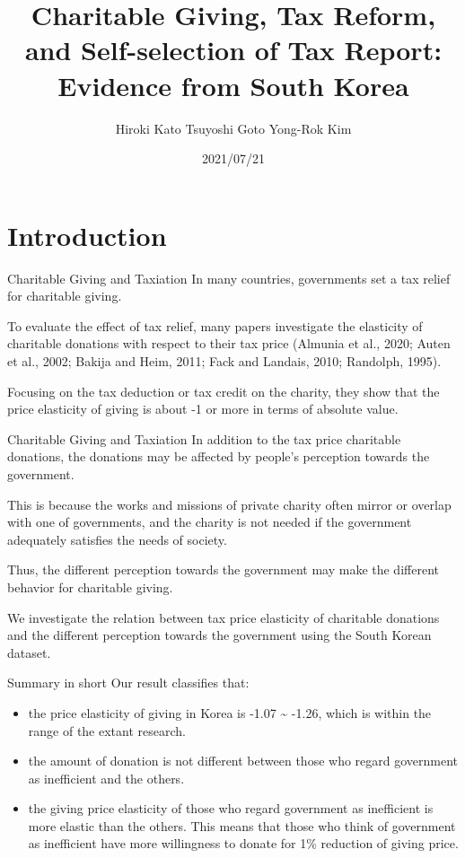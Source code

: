 \documentclass[
  ignorenonframetext,
  aspectratio=169]{beamer}
\title{Charitable Giving, Tax Reform, and Self-selection of Tax Report: Evidence from South Korea}
\author[shortname]{ Hiroki Kato  Tsuyoshi Goto  Yong-Rok Kim }
\date{2021/07/21}
\providecommand{\tightlist}{%
  \setlength{\itemsep}{0pt}\setlength{\parskip}{0pt}}
\begin{document}
\frame{\titlepage}

\hypertarget{introduction}{%
\section{Introduction}\label{introduction}}

\begin{frame}{Charitable Giving and Taxiation}
\protect\hypertarget{charitable-giving-and-taxiation}{}
In many countries, governments set a tax relief for charitable giving.

To evaluate the effect of tax relief, many papers investigate the elasticity of charitable donations with respect to their tax price (Almunia et al., 2020; Auten et al., 2002; Bakija and Heim, 2011; Fack and Landais, 2010; Randolph, 1995).

Focusing on the tax deduction or tax credit on the charity, they show that the price elasticity of giving is about -1 or more in terms of absolute value.
\end{frame}

\begin{frame}{Charitable Giving and Taxiation}
\protect\hypertarget{charitable-giving-and-taxiation-1}{}
In addition to the tax price charitable donations, the donations may be affected by people's perception towards the government.

This is because the works and missions of private charity often mirror or overlap with one of governments, and the charity is not needed if the government adequately satisfies the needs of society.

Thus, the different perception towards the government may make the different behavior for charitable giving.

We investigate the relation between tax price elasticity of charitable donations and the different perception towards the government using the South Korean dataset.
\end{frame}

\begin{frame}{Summary in short}
\protect\hypertarget{summary-in-short}{}
Our result classifies that:

\begin{itemize}
\tightlist
\item
  the price elasticity of giving in Korea is -1.07 \textasciitilde{} -1.26, which is within the range of the extant research.
\item
  the amount of donation is not different between those who regard government as inefficient and the others.
\item
  the giving price elasticity of those who regard government as inefficient is more elastic than the others. This means that those who think of government as inefficient have more willingness to donate for 1\% reduction of giving price.
\end{itemize}
\end{frame}
\end{document}
